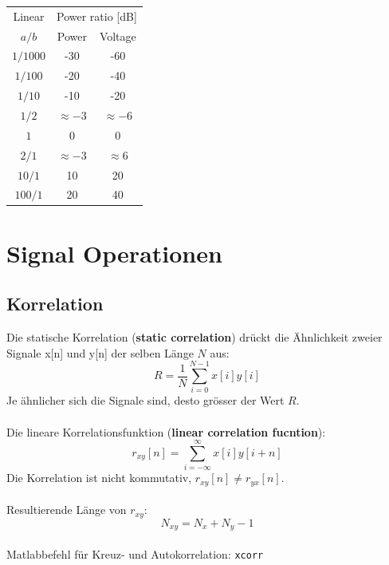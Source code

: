 \begin{table}[ht]
  \centering
  \begin{tabular}{ccc} \toprule
  Linear	& \multicolumn{2}{c}{Power ratio [dB]} \\ 
  $a/b$		& Power		& Voltage	\\ \midrule
  $1/1000$	& -30		& -60		\\
  $1/100$	& -20		& -40		\\
  $1/10$	& -10		& -20		\\
  $1/2$		& $\approx -3$& $\approx -6$\\
  $1$		& 0			& 0			\\
  $2/1$		& $\approx -3$& $\approx 6$\\
  $10/1$	& 10		& 20		\\
  $100/1$	& 20		& 40		\\  \bottomrule
  \end{tabular}
\end{table}

\section{Signal Operationen}
\subsection{Korrelation}
Die statische Korrelation (\textbf{static correlation}) drückt die Ähnlichkeit
zweier Signale x[n] und y[n] der selben Länge $N$ aus:
\[ R = \frac{1}{N} \sum_{i=0}^{N-1} x[i]y[i] \]
Je ähnlicher sich die Signale sind, desto grösser der Wert $R$.\\\\
Die lineare Korrelationsfunktion (\textbf{linear correlation fucntion}):
\[ r_{xy}[n] = \sum_{i=-\infty}^{\infty} x[i]y[i+n] \]
Die Korrelation ist nicht kommutativ, $r_{xy}[n] \neq r_{yx}[n]$.\\\\
Resultierende Länge von $r_{xy}$:
\[ N_{xy} = N_x + N_y - 1 \]
~\\
Matlabbefehl für Kreuz- und Autokorrelation: \verb|xcorr|

